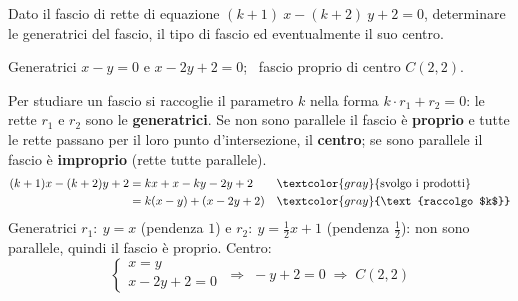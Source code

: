 
\begin{question}[ID=1.1, subtitle={Fascio $(k+1)x-(k+2)y+2=0$: tipo e centro}, tags={fascio di rette}, difficulty=facile]
Dato il fascio di rette di equazione $(k+1) \ x - (k+2) \ y +2 = 0$, determinare le generatrici del fascio, il tipo di fascio ed eventualmente il suo centro.
\begin{solution}
Generatrici $x-y=0$ e $x-2y+2=0$; \ fascio proprio di centro $C(2,2)$.
\end{solution}
\begin{explanation}
Per studiare un fascio si raccoglie il parametro $k$ nella forma $k\cdot r_1+r_2=0$: le rette $r_1$ e $r_2$ sono le \textbf{generatrici}. Se non sono parallele il fascio è \textbf{proprio} e tutte le rette passano per il loro punto d'intersezione, il \textbf{centro}; se sono parallele il fascio è \textbf{improprio} (rette tutte parallele).
\[\begin{aligned}
(k+1)x-(k+2)y+2 &= kx+x-ky-2y+2 && \textcolor{gray}{\text{svolgo i prodotti}}\\
&= k(x-y)+(x-2y+2) && \textcolor{gray}{\text{raccolgo $k$}}
\end{aligned}\]
Generatrici $r_1:\ y=x$ (pendenza $1$) e $r_2:\ y=\tfrac12x+1$ (pendenza $\tfrac12$): non sono parallele, quindi il fascio è proprio. Centro:
\[ \begin{cases} x=y\\ x-2y+2=0\end{cases} \;\Rightarrow\; -y+2=0 \;\Rightarrow\; C(2,2) \]
\end{explanation}
\end{question}

